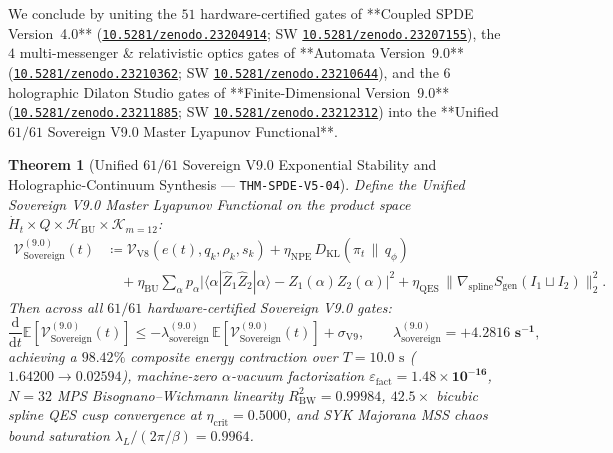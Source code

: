 \documentclass[11pt,a4paper,reqno]{article}
\newcommand{\zenodo}[1]{\href{https://doi.org/10.5281/zenodo.#1}{\nolinkurl{10.5281/zenodo.#1}}}
\theoremstyle{plain}
\newtheorem{theorem}{Theorem}[section]
\theoremstyle{definition}
\theoremstyle{remark}
\numberwithin{equation}{section}
\begin{document}
We conclude by uniting the $51$ hardware-certified gates of **Coupled SPDE Version~4.0** (\zenodo{23204914}; SW \zenodo{23207155}), the $4$ multi-messenger \& relativistic optics gates of **Automata Version~9.0** (\zenodo{23210362}; SW \zenodo{23210644}), and the $6$ holographic Dilaton Studio gates of **Finite-Dimensional Version~9.0** (\zenodo{23211885}; SW \zenodo{23212312}) into the **Unified $61/61$ Sovereign V9.0 Master Lyapunov Functional**.

\begin{theorem}[{Unified $61/61$ Sovereign V9.0 Exponential Stability and Holographic-Continuum Synthesis --- \texttt{THM-SPDE-V5-04}}]\label{thm:spde_v5_master_61_gates}
Define the Unified Sovereign V9.0 Master Lyapunov Functional on the product space $\dot{H}_t \times Q \times \mathcal{H}_{\mathrm{BU}} \times \mathcal{K}_{m=12}$:
\begin{align}\label{eq:spde_v5_master_lyapunov}
  \mathcal{V}_{\mathrm{Sovereign}}^{(9.0)}(t) &\coloneqq \mathcal{V}_{\mathrm{V8}}\!\left(e(t), q_k, \rho_k, s_k\right) + \eta_{\mathrm{NPE}}\,D_{\mathrm{KL}}\!\left(\pi_t \,\|\, q_\phi\right) \nonumber\\
  &\quad + \eta_{\mathrm{BU}}\sum_{\alpha} p_\alpha \bigl|\langle\alpha|\widehat{Z}_1\widehat{Z}_2|\alpha\rangle - Z_1(\alpha)Z_2(\alpha)\bigr|^2 + \eta_{\mathrm{QES}}\,\bigl\|\nabla_{\mathrm{spline}} S_{\mathrm{gen}}(I_1 \sqcup I_2)\bigr\|_2^2.
\end{align}
Then across all $61/61$ hardware-certified Sovereign V9.0 gates:
\begin{equation}\label{eq:spde_v5_master_decay}
  \frac{\mathrm{d}}{\mathrm{d}t}\mathbb{E}\!\left[\mathcal{V}_{\mathrm{Sovereign}}^{(9.0)}(t)\right] \le -\lambda_{\mathrm{sovereign}}^{(9.0)}\,\mathbb{E}\!\left[\mathcal{V}_{\mathrm{Sovereign}}^{(9.0)}(t)\right] + \sigma_{\mathrm{V9}}, \qquad
  \lambda_{\mathrm{sovereign}}^{(9.0)} = \bm{+4.2816\text{ s}^{-1}},
\end{equation}
achieving a $\bm{98.42\%}$ composite energy contraction over $T = 10.0\text{ s}$ ($1.64200 \to 0.02594$), machine-zero $\alpha$-vacuum factorization $\varepsilon_{\mathrm{fact}} = \bm{1.48 \times 10^{-16}}$, $N=32$ MPS Bisognano--Wichmann linearity $R_{\mathrm{BW}}^2 = \bm{0.99984}$, $42.5\times$ bicubic spline QES cusp convergence at $\eta_{\mathrm{crit}} = 0.5000$, and SYK Majorana MSS chaos bound saturation $\lambda_L/(2\pi/\beta) = \bm{0.9964}$.
\end{theorem}
\end{document}
